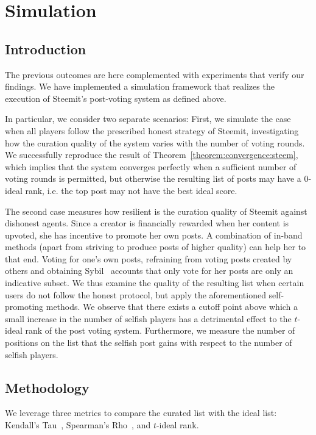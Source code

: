 \section{Simulation}
  \subsection{Introduction}
    The previous outcomes are here complemented with experiments that verify our
    findings. We have implemented a simulation framework that realizes the
    execution of Steemit's post-voting system as defined above.

    In particular, we consider two separate scenarios: First, we simulate the
    case when all players follow the prescribed honest strategy of Steemit,
    investigating how the curation quality of the system varies with the number
    of voting rounds. We successfully reproduce the result of
    Theorem~\ref{theorem:convergence:steem}, which implies that the system
    converges perfectly when a sufficient number of voting rounds is permitted,
    but otherwise the resulting list of posts may have a 0-ideal rank, i.e. the
    top post may not have the best ideal score.

    The second case measures how resilient is the curation quality of Steemit
    against dishonest agents. Since a creator is financially rewarded when her
    content is upvoted, she has incentive to promote her own posts. A
    combination of in-band methods (apart from striving to produce posts of
    higher quality) can help her to that end. Voting for one's own posts,
    refraining from voting posts created by others and obtaining
    Sybil~\cite{sybilattack} accounts that only vote for her posts are only an
    indicative subset. We thus examine the quality of the resulting list when
    certain users do not follow the honest protocol, but apply the
    aforementioned self-promoting methods. We observe that there exists a cutoff
    point above which a small increase in the number of selfish players has a
    detrimental effect to the $t$-ideal rank of the post voting system.
    Furthermore, we measure the number of positions on the list that the selfish
    post gains with respect to the number of selfish players.

  \subsection{Methodology}
    We leverage three metrics to compare the curated list with the ideal list:
    Kendall's Tau~\cite{kendall1955rank}, Spearman's
    Rho~\cite{spearman1904proof}, and $t$-ideal rank.

